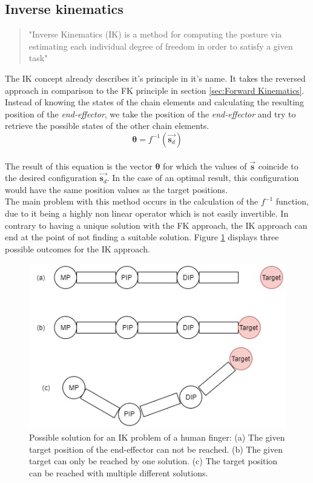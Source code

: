 \subsection{Inverse kinematics}
\label{sec:inverse kinematics}
\begin{quote}"Inverse Kinematics (IK) is a method for computing the posture via estimating each individual degree of freedom in order to satisfy a given task" \cite{AndreasAristidouandJoanLasenby.2009}\end{quote}
The IK concept already describes it's principle in it's name. It takes the reversed approach in comparison to the FK principle in section \ref{sec:Forward Kinematics}. Instead of knowing the states of the chain elements and calculating the resulting position of the \textit{end-effector}, we take the position of the \textit{end-effector} and try to retrieve the possible states of the other chain elements. \\
\begin{equation}
\label{ik problem formula}
\pmb{\theta}=f^{-1}(\vec{\textbf{s}_{d}})
\end{equation}
\\The result of this equation is the vector $\pmb{\theta}$ for which the values of $\vec{\textbf{s}}$ coincide to the desired configuration $\vec{\textbf{s}_{d}}$. In the case of an optimal result, this configuration would have the same position values as the target positions.\\ The main problem with this method occurs in the calculation of the $f^{-1}$ function, due to it being a highly non linear operator which is not easily invertible.
In contrary to having a unique solution with the FK approach, the IK approach can end at the point of not finding a suitable solution. Figure \ref{IkSolutions} displays three possible outcomes for the IK approach.
\begin{figure}[H]
\centering
\includegraphics[scale=0.6]{images/Ik_figure.jpg}
\caption{Possible solution for an IK problem of a human finger: (a) The given target position of the end-effector can not be reached. (b) The given target can only be reached by one solution. (c) The target position can be reached with multiple different solutions.}
\label{IkSolutions}
\end{figure}
